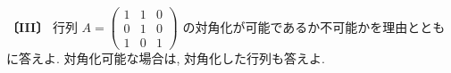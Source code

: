 \noindent\textbf{〔III〕}
行列 $A=\begin{pmatrix}
1 & 1 & 0\\
0 & 1 & 0\\
1 & 0 & 1
\end{pmatrix}$ の対角化が可能であるか不可能かを理由とともに答えよ.
対角化可能な場合は, 対角化した行列も答えよ.
